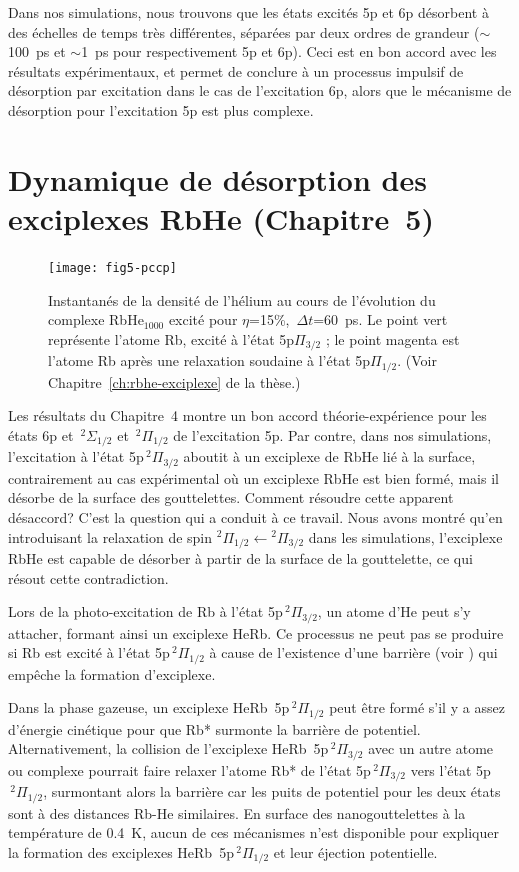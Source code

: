 		Dans nos simulations, nous trouvons que les états excités 5p et 6p désorbent à des échelles de temps très différentes, séparées par deux ordres de grandeur ($\sim$100~ps et $\sim$1~ps pour respectivement 5p et 6p). 
		Ceci est en bon accord avec les résultats expérimentaux, et permet de conclure à un processus impulsif de désorption par excitation dans le cas de l'excitation 6p, alors que le mécanisme de désorption pour l'excitation 5p est plus complexe.

	\section*{Dynamique de désorption des exciplexes RbHe \small{(Chapitre~5)}}
		\begin{figure}
			\centering
			\texttt{[image: fig5-pccp]}\caption{Instantanés de la densité de l'hélium au cours de l'évolution du complexe RbHe$_{1000}$ excité pour $\eta$=15\%,~$\Delta t$=60~ps. Le point vert représente l'atome Rb, excité à l'état 5p$\Pi_{3/2}$ ; le point magenta est l'atome Rb après une relaxation soudaine à l'état 5p$\Pi_{1/2}$. (Voir Chapitre~\ref{ch:rbhe-exciplexe} de la thèse.)}
			\label{fig:snapshots}
		\end{figure}	
		Les résultats du Chapitre~4 montre un bon accord théorie-expérience pour les états 6p et $\,^2\Sigma_{1/2}$  et $\,^2\Pi_{1/2}$ de l'excitation 5p.
		Par contre, dans nos simulations, l'excitation à l'état 5p$\,^2\Pi_{3/2}$ aboutit à un exciplexe de RbHe lié à la surface, contrairement au cas expérimental où un exciplexe RbHe est bien formé, mais il désorbe de la surface des gouttelettes. 
		Comment résoudre cette apparent désaccord?
		C'est la question qui a conduit à ce travail.
	    Nous avons montré qu'en introduisant la relaxation de spin $^2\Pi_{1/2}\!\leftarrow\!^2\Pi_{3/2}$ dans les simulations, l'exciplexe RbHe est capable de désorber à partir de la surface de la gouttelette, ce qui résout cette contradiction.
		
		Lors de la photo-excitation de Rb à l'état 5p$\,^2\Pi_{3/2}$, un atome d'He peut s'y  attacher, formant ainsi un exciplexe HeRb.
		Ce processus ne peut pas se produire si Rb est excité à l'état 5p$\,^2\Pi_{1/2}$ à cause de l'existence d'une barrière (voir ) qui empêche la formation d'exciplexe.
		
		Dans la phase gazeuse, un exciplexe HeRb~5p$\,^2\Pi_{1/2}$ peut être formé s'il y a assez d'énergie cinétique pour que Rb* surmonte la barrière de potentiel.
		Alternativement, la collision de l'exciplexe HeRb~5p$\,^2\Pi_{3/2}$ avec un autre atome ou complexe pourrait faire relaxer l'atome Rb* de l'état 5p$\,^2\Pi_{3/2}$ vers l'état 5p$\,^2\Pi_{1/2}$, surmontant alors la barrière car les puits de potentiel pour les deux états sont à des distances Rb-He similaires. 
		En surface des nanogouttelettes à la température de 0.4~K, aucun de ces mécanismes n'est disponible pour expliquer la formation des exciplexes HeRb~5p$\,^2\Pi_{1/2}$ et leur éjection potentielle.
		
